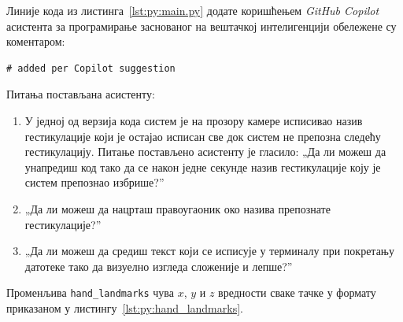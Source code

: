 \documentclass[master]{finthesis}
\begin{document}
Линије кода из листинга~\ref{lst:py:main.py} додате коришћењем \textit{GitHub Copilot} асистента за програмирање заснованог на вештачкој интелигенцији обележене су коментаром: \begin{verbatim}# added per Copilot suggestion \end{verbatim} Питања постављана асистенту:
\begin{enumerate}
    \item У једној од верзија кода систем је на прозору камере исписивао назив гестикулације који је остајао исписан све док систем не препозна следећу гестикулацију. Питање постављено асистенту је гласило: „Да ли можеш да унапредиш код тако да се након једне секунде назив гестикулације коју је систем препознао избрише?”
    \item „Да ли можеш да нацрташ правоугаоник око назива препознате гестикулације?” 
    \item „Да ли можеш да средиш текст који се исписује у терминалу при покретању датотеке тако да визуелно изгледа сложеније и лепше?”
\end{enumerate}

Променљива \verb |hand_landmarks| чува $x$, $y$ и $z$ вредности сваке тачке у формату приказаном у листингу~\ref{lst:py:hand_landmarks}.
\end{document}
